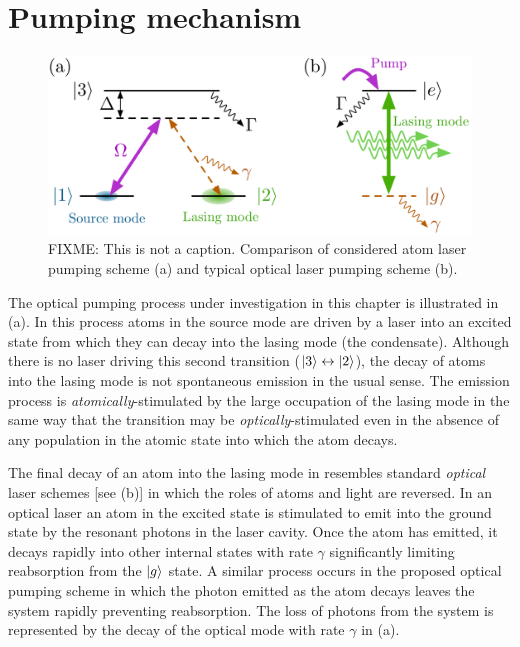 \section{Pumping mechanism}

\begin{figure}
    \centering
    \includegraphics[width=14cm]{LambdaModel}
    \caption{FIXME: This is not a caption. Comparison of considered atom laser pumping scheme (a) and typical optical laser pumping scheme (b).\label{OpticalPumping:LambdaModel}}
\end{figure}

The optical pumping process under investigation in this chapter is illustrated in (a).  In this process atoms in the source mode are driven by a laser into an excited state from which they can decay into the lasing mode (the condensate).  Although there is no laser driving this second transition (${\left|3\right>}\leftrightarrow{\ensuremath{\left|2\right>}}$), the decay of atoms into the lasing mode is not spontaneous emission in the usual sense.  The emission process is \emph{atomically}-stimulated by the large occupation of the lasing mode in the same way that the transition may be \emph{optically}-stimulated even in the absence of any population in the atomic state into which the atom decays.

The final decay of an atom into the lasing mode in  resembles standard \emph{optical} laser schemes [see (b)] in which the roles of atoms and light are reversed.  In an optical laser an atom in the excited state is stimulated to emit into the ground state by the resonant photons in the laser cavity.  Once the atom has emitted, it decays rapidly into other internal states with rate $\gamma$ significantly limiting reabsorption from the ${\left|g\right>}$ state.  A similar process occurs in the proposed optical pumping scheme in which the photon emitted as the atom decays  leaves the system rapidly preventing reabsorption.  The loss of photons from the system is represented by the decay of the optical mode with rate $\gamma$ in (a).

